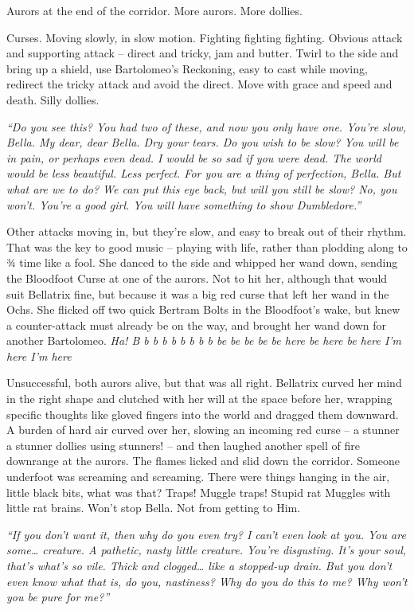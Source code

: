 Aurors at the end of the corridor. More aurors. More dollies.

Curses. Moving slowly, in slow motion. Fighting fighting fighting.
Obvious attack and supporting attack -- direct and tricky, jam and
butter. Twirl to the side and bring up a shield, use Bartolomeo's
Reckoning, easy to cast while moving, redirect the tricky attack and
avoid the direct. Move with grace and speed and death. Silly dollies.

\emph{``Do you see this? You had two of these, and now you only have
one. You're slow, Bella. My dear, dear Bella. Dry your tears. Do you
wish to be slow? You will be in pain, or perhaps even dead. I would be
so sad if you were dead. The world would be less beautiful. Less
perfect. For you are a thing of perfection, Bella. But what are we to
do? We can put this eye back, but will you still be slow? No, you won't.
You're a good girl. You will have something to show Dumbledore.''}

Other attacks moving in, but they're slow, and easy to break out of
their rhythm. That was the key to good music -- playing with life,
rather than plodding along to ¾ time like a fool. She danced to the side
and whipped her wand down, sending the Bloodfoot Curse at one of the
aurors. Not to hit her, although that would suit Bellatrix fine, but
because it was a big red curse that left her wand in the Ochs. She
flicked off two quick Bertram Bolts in the Bloodfoot's wake, but knew a
counter-attack must already be on the way, and brought her wand down for
another Bartolomeo. \emph{Ha! B b b b b b b b b be be be be be here be
here be here I'm here I'm here}

Unsuccessful, both aurors alive, but that was all right. Bellatrix
curved her mind in the right shape and clutched with her will at the
space before her, wrapping specific thoughts like gloved fingers into
the world and dragged them downward. A burden of hard air curved over
her, slowing an incoming red curse -- a stunner a stunner dollies using
stunners! -- and then laughed another spell of fire downrange at the
aurors. The flames licked and slid down the corridor. Someone underfoot
was screaming and screaming. There were things hanging in the air,
little black bits, what was that? Traps! Muggle traps! Stupid rat
Muggles with little rat brains. Won't stop Bella. Not from getting to
Him.

\emph{``If you don't want it, then why do you even try? I can't even
look at you. You are some\ldots{} creature. A pathetic, nasty little
creature. You're disgusting. It's your soul, that's what's so vile.
Thick and clogged\ldots{} like a stopped-up drain. But you don't even
know what that is, do you, nastiness? Why do you do this to me? Why
won't you be pure for me?''}

